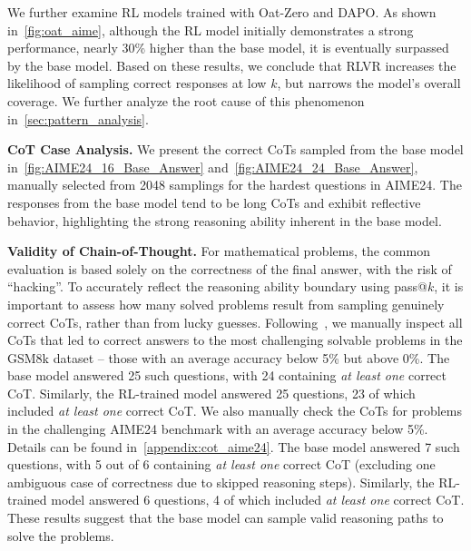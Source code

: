We further examine RL models trained with Oat-Zero and DAPO. As shown in~\cref{fig:oat_aime}, although the RL model initially demonstrates a strong performance, nearly 30\% higher than the base model, it is eventually surpassed by the base model. 
Based on these results, we conclude that RLVR increases the likelihood of sampling correct responses at low $k$, but narrows the model's overall coverage. We further analyze the root cause of this phenomenon in~\cref{sec:pattern_analysis}.


\textbf{CoT Case Analysis.}
We present the correct CoTs sampled from the base model in~\cref{fig:AIME24_16_Base_Answer} and~\cref{fig:AIME24_24_Base_Answer}, manually selected from 2048 samplings for the hardest questions in AIME24. 
The responses from the base model tend to be long CoTs and exhibit reflective behavior, highlighting the strong reasoning ability inherent in the base model.



\textbf{Validity of Chain-of-Thought.}  
For mathematical problems, the common evaluation is based solely on the correctness of the final answer, with the risk of ``hacking''.  
To accurately reflect the reasoning ability boundary using pass@$k$, it is important to assess how many solved problems result from sampling genuinely correct CoTs, rather than from lucky guesses. Following~\cite{brown2024monkey}, we manually inspect all CoTs that led to correct answers to the most challenging solvable problems in the GSM8k dataset -- those with an average accuracy below 5\% but above 0\%.
The base model answered 25 such questions, with 24 containing \textit{at least one} correct CoT. Similarly, the RL-trained model answered 25 questions, 23 of which included \textit{at least one} correct CoT.
We also manually check the CoTs for problems in the challenging AIME24 benchmark with an average accuracy below 5\%. Details can be found in~\cref{appendix:cot_aime24}.
The base model answered 7 such questions, with 5 out of 6 containing \textit{at least one} correct CoT (excluding one ambiguous case of correctness due to skipped reasoning steps). Similarly, the RL-trained model answered 6 questions, 4 of which included \textit{at least one} correct CoT.
These results suggest that the base model can sample valid reasoning paths to solve the problems.

